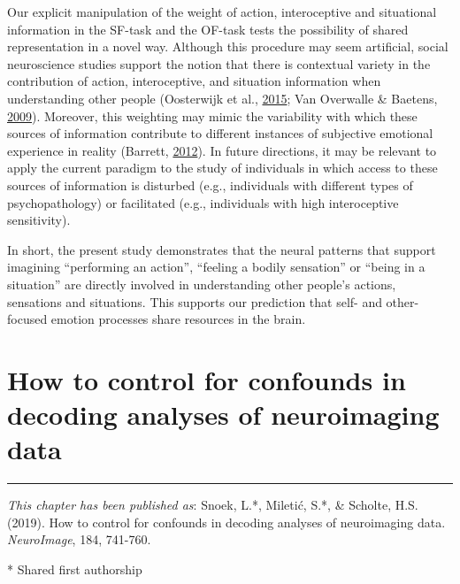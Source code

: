 \documentclass[11pt,american,a4paper,oneside,]{memoir} %
\begin{document}
Our explicit manipulation of the weight of action, interoceptive and situational information in the SF-task and the OF-task tests the possibility of shared representation in a novel way. Although this procedure may seem artificial, social neuroscience studies support the notion that there is contextual variety in the contribution of action, interoceptive, and situation information when understanding other people (Oosterwijk et al., \protect\hyperlink{ref-oosterwijk2015concepts}{2015}; Van Overwalle \& Baetens, \protect\hyperlink{ref-van2009understanding}{2009}). Moreover, this weighting may mimic the variability with which these sources of information contribute to different instances of subjective emotional experience in reality (Barrett, \protect\hyperlink{ref-barrett2012emotions}{2012}). In future directions, it may be relevant to apply the current paradigm to the study of individuals in which access to these sources of information is disturbed (e.g., individuals with different types of psychopathology) or facilitated (e.g., individuals with high interoceptive sensitivity).

In short, the present study demonstrates that the neural patterns that support imagining ``performing an action'', ``feeling a bodily sensation'' or ``being in a situation'' are directly involved in understanding other people's actions, sensations and situations. This supports our prediction that self- and other-focused emotion processes share resources in the brain.

\hypertarget{confounds-decoding}{%
\chapter{How to control for confounds in decoding analyses of neuroimaging data}\label{confounds-decoding}}


\vspace*{\fill}

\begin{center}\rule{0.5\linewidth}{0.5pt}\end{center}

\small

\noindent
\emph{This chapter has been published as}: Snoek, L.*, Miletić, S.*, \& Scholte, H.S. (2019). How to control for confounds in decoding analyses of neuroimaging data. \emph{NeuroImage}, 184, 741-760.

* Shared first authorship
\end{document}
